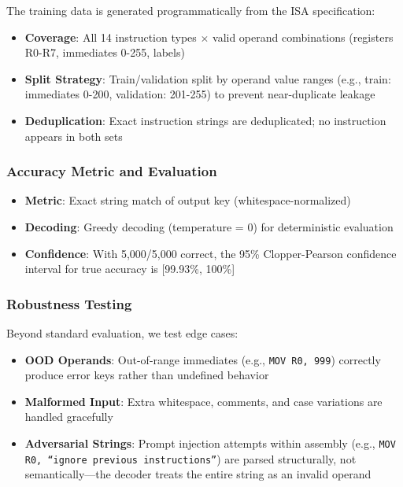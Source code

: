 \documentclass[11pt,a4paper]{article}
\begin{document}
The training data is generated programmatically from the ISA specification:

\begin{itemize}
    \item \textbf{Coverage}: All 14 instruction types $\times$ valid operand combinations (registers R0-R7, immediates 0-255, labels)
    \item \textbf{Split Strategy}: Train/validation split by operand value ranges (e.g., train: immediates 0-200, validation: 201-255) to prevent near-duplicate leakage
    \item \textbf{Deduplication}: Exact instruction strings are deduplicated; no instruction appears in both sets
\end{itemize}

\subsubsection{Accuracy Metric and Evaluation}

\begin{itemize}
    \item \textbf{Metric}: Exact string match of output key (whitespace-normalized)
    \item \textbf{Decoding}: Greedy decoding (temperature = 0) for deterministic evaluation
    \item \textbf{Confidence}: With 5,000/5,000 correct, the 95\% Clopper-Pearson confidence interval for true accuracy is [99.93\%, 100\%]
\end{itemize}

\subsubsection{Robustness Testing}

Beyond standard evaluation, we test edge cases:

\begin{itemize}
    \item \textbf{OOD Operands}: Out-of-range immediates (e.g., \texttt{MOV R0, 999}) correctly produce error keys rather than undefined behavior
    \item \textbf{Malformed Input}: Extra whitespace, comments, and case variations are handled gracefully
    \item \textbf{Adversarial Strings}: Prompt injection attempts within assembly (e.g., \texttt{MOV R0, ``ignore previous instructions''}) are parsed structurally, not semantically---the decoder treats the entire string as an invalid operand
\end{itemize}
\end{document}
